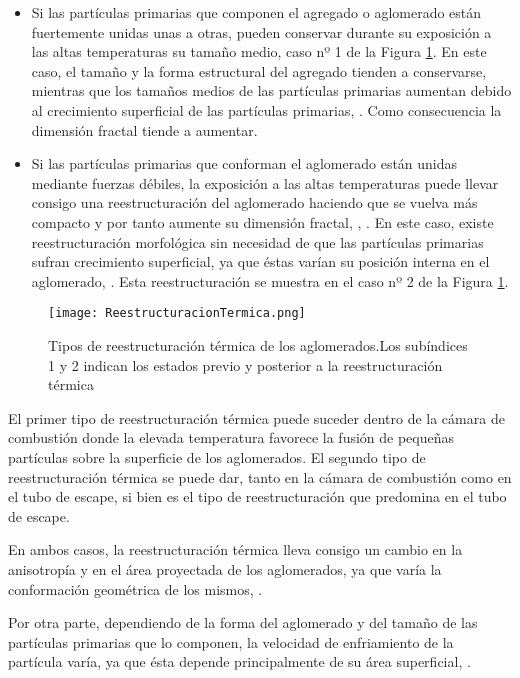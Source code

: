 \begin{itemize}
	\item Si las partículas primarias que componen el agregado o aglomerado están fuertemente unidas unas a otras, pueden conservar durante su exposición a las altas temperaturas su tamaño medio, caso nº 1 de la Figura \ref{fig:reestructuraciontermica}. En este caso, el tamaño y la forma estructural del agregado tienden a conservarse, mientras que los tamaños medios de las partículas primarias aumentan debido al crecimiento superficial de las partículas primarias, \cite{sempereetal:1993}. Como consecuencia la dimensión fractal tiende a aumentar.
	
	\item Si las partículas primarias que conforman el aglomerado están unidas mediante fuerzas débiles, la exposición a las altas temperaturas puede llevar consigo una reestructuración del aglomerado haciendo que se vuelva más compacto y por tanto aumente su dimensión fractal, \cite{stasio:2001}, \cite{dalisetal:2005}. En este caso, existe reestructuración morfológica sin necesidad de que las partículas primarias sufran crecimiento superficial, ya que éstas varían su posición interna en el aglomerado, \cite{schmidt:1988,liuetal:2004}. Esta reestructuración se muestra en el caso nº 2 de la Figura \ref{fig:reestructuraciontermica}.
	
\end{itemize}

\begin{figure}[ht]
	\centering
	\texttt{[image: ReestructuracionTermica.png]}	 
	\caption[Tipos de reestructuración térmica de los aglomerados]{Tipos de reestructuración térmica de los aglomerados.Los subíndices 1 y 2 indican los estados previo y posterior a la reestructuración térmica} \label{fig:reestructuraciontermica}
\end{figure} 

\par El primer tipo de reestructuración térmica puede suceder dentro de la cámara de combustión donde la elevada temperatura favorece la fusión de pequeñas partículas sobre la superficie de los aglomerados. El segundo tipo de reestructuración térmica se puede dar, tanto en la cámara de combustión como en el tubo de escape, si bien es el tipo de reestructuración que predomina en el tubo de escape.
\par En ambos casos, la reestructuración térmica lleva consigo un cambio en la anisotropía y en el área proyectada de los aglomerados, ya que varía la conformación geométrica de los mismos, \cite{mikhailovetal:1996}.
\par Por otra parte, dependiendo de la forma del aglomerado y del tamaño de las partículas primarias que lo componen, la velocidad de enfriamiento de la partícula varía, ya que ésta depende principalmente de su área superficial, \cite{liuetal:2004}.
 
